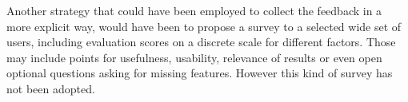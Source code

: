 Another strategy that could have been employed to collect the feedback in a more explicit way, would have been to propose a survey to a selected wide set of users, including evaluation scores on a discrete scale for different factors. Those may include points for usefulness, usability, relevance of results or even open optional questions asking for missing features. However this kind of survey has not been adopted.


